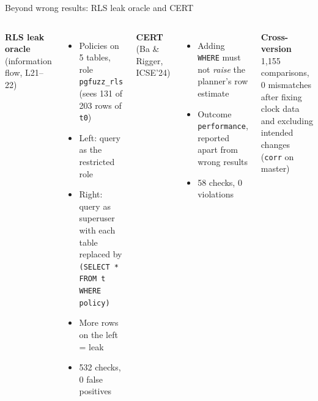 \documentclass[aspectratio=169,11pt]{beamer}
\begin{document}
\begin{frame}{Beyond wrong results: RLS leak oracle and CERT}
\begin{columns}[T]
\textbf{RLS leak oracle} (information flow, L21--22)
\small
\begin{itemize}
  \item Policies on 5 tables, role \texttt{pgfuzz\_rls} (sees 131 of 203 rows of \texttt{t0})
  \item Left: query as the restricted role
  \item Right: query as superuser with each table replaced by
    \texttt{(SELECT * FROM t WHERE policy)}
  \item More rows on the left = \alert{leak}
  \item 532 checks, 0 false positives
\end{itemize}
\textbf{CERT} (Ba \& Rigger, ICSE'24)
\small
\begin{itemize}
  \item Adding \texttt{WHERE} must not \emph{raise} the planner's row estimate
  \item Outcome \texttt{performance}, reported apart from wrong results
  \item 58 checks, 0 violations
\end{itemize}
\medskip
\normalsize\textbf{Cross-version}\\
\small 1{,}155 comparisons, 0 mismatches after fixing clock data and
excluding intended changes (\texttt{corr} on master)
\end{columns}
\end{frame}
\end{document}
